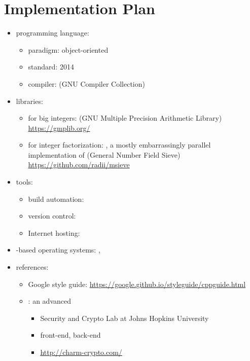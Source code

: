 \section{Implementation Plan}


\begin{itemize}
\item programming language: 
  \begin{itemize}
  \item paradigm: object-oriented
  \item standard: 2014
  \item compiler:  (GNU Compiler Collection)
  \end{itemize}
\item libraries:
  \begin{itemize}
  \item for big integers: 
    (GNU Multiple Precision Arithmetic Library) \\
    \url{https://gmplib.org/}
  \item for integer factorization: ,
    a mostly embarrassingly parallel
    implementation of 
    (General Number Field Sieve) \\
    \url{https://github.com/radii/msieve}
  \end{itemize}
\item tools:
  \begin{itemize}
  \item build automation: 
  \item version control: 
  \item Internet hosting: \github \\ \crygithub
  \end{itemize}
\item {}-based operating systems:
  , 
\item references:
\begin{itemize}
\item Google  style guide:
    \url{https://google.github.io/styleguide/cppguide.html}
\item {}: an advanced \cf
  \begin{itemize}
  \item Security and Crypto Lab at Johns Hopkins University
  \item {} front-end,  back-end
  \item \url{http://charm-crypto.com/}
  \end{itemize}
\end{itemize}
\end{itemize}
